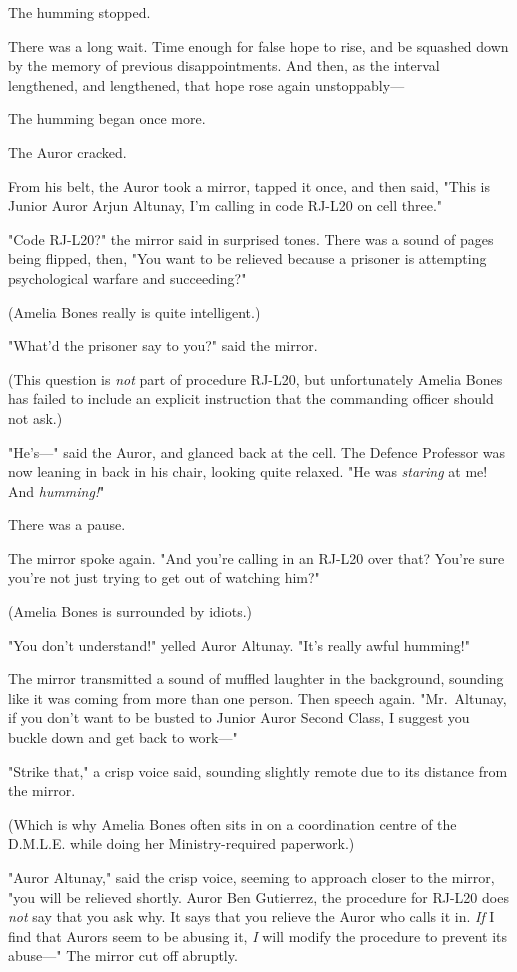 The humming stopped.

There was a long wait. Time enough for false hope to rise, and be squashed down
by the memory of previous disappointments. And then, as the interval
lengthened, and lengthened, that hope rose again unstoppably---

The humming began once more.

The Auror cracked.

From his belt, the Auror took a mirror, tapped it once, and then said, "This is
Junior Auror Arjun Altunay, I'm calling in code RJ-L20 on cell three."

"Code RJ-L20?" the mirror said in surprised tones. There was a sound of pages
being flipped, then, "You want to be relieved because a prisoner is attempting
psychological warfare and succeeding?"

(Amelia Bones really is quite intelligent.)

"What'd the prisoner say to you?" said the mirror.

(This question is \emph{not} part of procedure RJ-L20, but unfortunately Amelia
Bones has failed to include an explicit instruction that the commanding officer
should not ask.)

"He's---" said the Auror, and glanced back at the cell. The Defence Professor
was now leaning in back in his chair, looking quite relaxed. "He was
\emph{staring} at me! And \emph{humming!}"

There was a pause.

The mirror spoke again. "And you're calling in an RJ-L20 over that? You're sure
you're not just trying to get out of watching him?"

(Amelia Bones is surrounded by idiots.)

"You don't understand!" yelled Auror Altunay. "It's really awful humming!"

The mirror transmitted a sound of muffled laughter in the background, sounding
like it was coming from more than one person. Then speech again. "Mr.~Altunay,
if you don't want to be busted to Junior Auror Second Class, I suggest you
buckle down and get back to work---"

"Strike that," a crisp voice said, sounding slightly remote due to its distance
from the mirror.

(Which is why Amelia Bones often sits in on a coordination centre of the
D.M.L.E. while doing her Ministry-required paperwork.)

"Auror Altunay," said the crisp voice, seeming to approach closer to the
mirror, "you will be relieved shortly. Auror Ben Gutierrez, the procedure for
RJ-L20 does \emph{not} say that you ask why. It says that you relieve the Auror
who calls it in. \emph{If} I find that Aurors seem to be abusing it, \emph{I}
will modify the procedure to prevent its abuse---" The mirror cut off abruptly.

